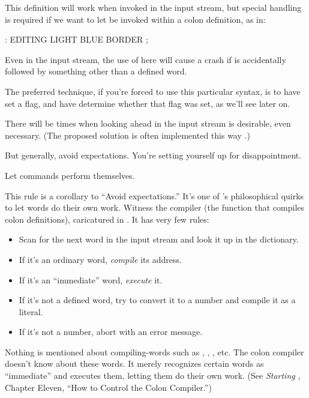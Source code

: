 This definition will work when invoked in the input stream, but special
handling is required if we want to let  be invoked within a
colon definition, as in:
\begin{Code}
: EDITING   LIGHT BLUE BORDER ;
\end{Code}
Even in the input stream, the use of  here will cause a
crash if  is accidentally followed by something other than a
defined word.

The preferred technique, if you're forced to use this particular
syntax, is to have  set a flag, and have 
determine whether that flag was set, as we'll see later on.

There will be times when looking ahead in the input stream is desirable,
even necessary. (The proposed  solution is often implemented
this way \cite{rosen82}.)

But generally, avoid expectations. You're setting yourself up for
disappointment.

\begin{tip}
Let commands perform themselves.
\end{tip}%
%
This rule is a corollary to ``Avoid expectations.'' It's one of
\Forth{}'s philosophical quirks to let words do their own work. Witness
the \Forth{} compiler (the function that compiles colon definitions),
caricatured in . It has very few rules:



\begin{itemize}
\item Scan for the next word in the input stream and look it up in the
dictionary.

\item If it's an ordinary word, \emph{compile} its address.

\item If it's an ``immediate'' word, \emph{execute} it.

\item If it's not a defined word, try to convert it to a number and
compile it as a literal.

\item If it's not a number, abort with an error message.
\end{itemize}
Nothing is mentioned about compiling-words such as ,
, , etc. The colon compiler doesn't know about
these words. It merely recognizes certain words as ``immediate'' and
executes them, letting them do their own work. (See \emph{Starting
\Forth{}}, Chapter Eleven, ``How to Control the Colon Compiler.'')

